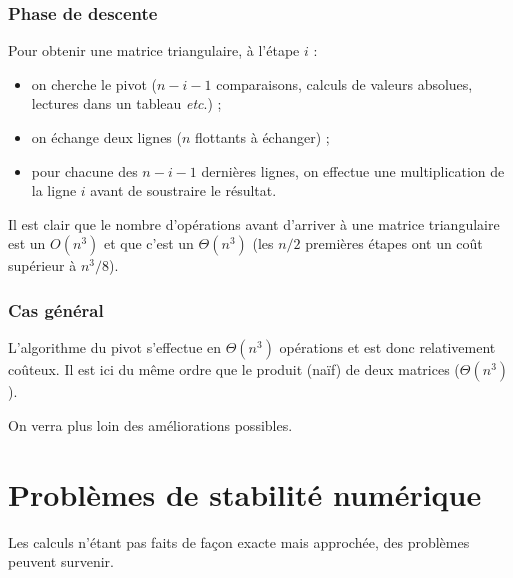 \subsubsection*{Phase de descente}
  Pour obtenir une matrice triangulaire, à  l'étape  $i$ :
  \begin{itemize}
    \item[\textbullet] on  cherche le  pivot  ($n-i-1$  comparaisons, calculs de valeurs absolues, lectures dans un tableau \emph{etc}.) ;
    \item[\textbullet] on échange deux lignes ($n$ flottants à échanger) ;
    \item[\textbullet] pour  chacune   des  $n-i-1$  dernières  lignes,   on  effectue  une multiplication de la  ligne $i$ avant de soustraire  le résultat.
  \end{itemize}
 Il  est clair que  le nombre d'opérations avant d'arriver  à une matrice
  triangulaire est un $O(n^{3})$  et que c'est un $\Theta(n^{3})$ (les
  $n/2$ premières étapes ont un coût supérieur à $n^{3} / 8$).

\subsubsection*{Cas général}

L'algorithme du pivot s'effectue en $\Theta(n^3)$ opérations et est donc relativement coûteux.
Il est ici du même ordre que le produit (naïf) de deux matrices ($\Theta(n^{3})$).

On verra plus loin des améliorations possibles.


\section{Problèmes de stabilité numérique}

Les calculs n'étant pas faits de façon exacte mais approchée, des
problèmes peuvent survenir.

